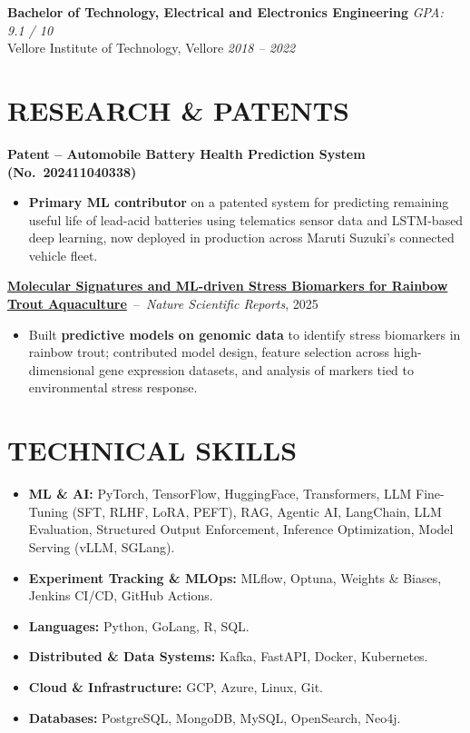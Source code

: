 \documentclass[9pt]{article}
\begin{document}
\textbf{Bachelor of Technology, Electrical and Electronics Engineering} \hfill \textit{GPA: 9.1 / 10}\\
Vellore Institute of Technology, Vellore \hfill \textit{2018 -- 2022}

\vspace{2pt}

\section*{RESEARCH \& PATENTS}

\textbf{Patent -- Automobile Battery Health Prediction System (No.~202411040338)}
\begin{itemize}
    \item \textbf{Primary ML contributor} on a patented system for predicting remaining useful life of lead-acid batteries using telematics sensor data and LSTM-based deep learning, now deployed in production across Maruti Suzuki's connected vehicle fleet.
\end{itemize}

\textbf{\href{https://www.nature.com/articles/s41598-025-30120-3}{Molecular Signatures and ML-driven Stress Biomarkers for Rainbow Trout Aquaculture}}~--~\textit{Nature Scientific Reports}, 2025
\begin{itemize}
    \item Built \textbf{predictive models on genomic data} to identify stress biomarkers in rainbow trout; contributed model design, feature selection across high-dimensional gene expression datasets, and analysis of markers tied to environmental stress response.
\end{itemize}

\section*{TECHNICAL SKILLS}
\begin{itemize}
    \item \textbf{ML \& AI:} PyTorch, TensorFlow, HuggingFace, Transformers, LLM Fine-Tuning (SFT, RLHF, LoRA, PEFT), RAG, Agentic AI, LangChain, LLM Evaluation, Structured Output Enforcement, Inference Optimization, Model Serving (vLLM, SGLang).
    \item \textbf{Experiment Tracking \& MLOps:} MLflow, Optuna, Weights \& Biases, Jenkins CI/CD, GitHub Actions.
    \item \textbf{Languages:} Python, GoLang, R, SQL.
    \item \textbf{Distributed \& Data Systems:} Kafka, FastAPI,  Docker, Kubernetes.
    \item \textbf{Cloud \& Infrastructure:} GCP, Azure, Linux, Git.
    \item \textbf{Databases:} PostgreSQL, MongoDB, MySQL, OpenSearch, Neo4j.
\end{itemize}
\end{document}

